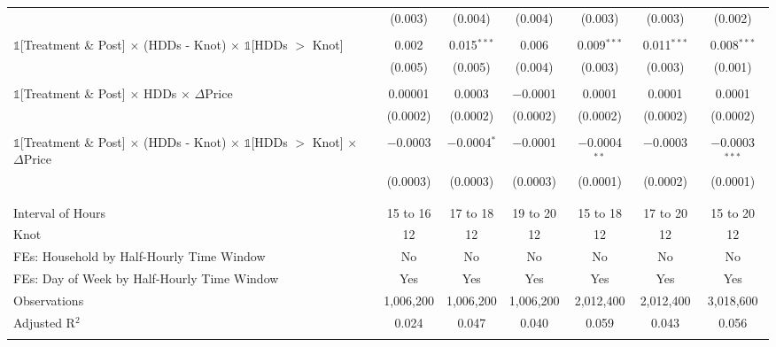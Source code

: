 \begin{table}[!htbp]
\begin{longtable}{@{\extracolsep{15pt}}lcccccc}
  & (0.003) & (0.004) & (0.004) & (0.003) & (0.003) & (0.002) \\ 
  & & & & & & \\ 
 $\mathbb{1}$[Treatment \& Post] $\times$ (HDDs - Knot) $\times$ $\mathbb{1}$[HDDs $>$ Knot] & 0.002 & 0.015$^{***}$ & 0.006 & 0.009$^{***}$ & 0.011$^{***}$ & 0.008$^{***}$ \\ 
  & (0.005) & (0.005) & (0.004) & (0.003) & (0.003) & (0.001) \\ 
  & & & & & & \\ 
 $\mathbb{1}$[Treatment \& Post] $\times$ HDDs $\times$ $\Delta$Price & 0.00001 & 0.0003 & $-$0.0001 & 0.0001 & 0.0001 & 0.0001 \\ 
  & (0.0002) & (0.0002) & (0.0002) & (0.0002) & (0.0002) & (0.0002) \\ 
  & & & & & & \\ 
 $\mathbb{1}$[Treatment \& Post] $\times$ (HDDs - Knot) $\times$ $\mathbb{1}$[HDDs $>$ Knot] $\times$ $\Delta$Price & $-$0.0003 & $-$0.0004$^{*}$ & $-$0.0001 & $-$0.0004$^{**}$ & $-$0.0003 & $-$0.0003$^{***}$ \\ 
  & (0.0003) & (0.0003) & (0.0003) & (0.0001) & (0.0002) & (0.0001) \\ 
  & & & & & & \\ 
\hline \\[-1.8ex] 
Interval of Hours & 15 to 16 & 17 to 18 & 19 to 20 & 15 to 18 & 17 to 20 & 15 to 20 \\ 
Knot & 12 & 12 & 12 & 12 & 12 & 12 \\ 
FEs: Household by Half-Hourly Time Window & No & No & No & No & No & No \\ 
FEs: Day of Week by Half-Hourly Time Window & Yes & Yes & Yes & Yes & Yes & Yes \\ 
Observations & 1,006,200 & 1,006,200 & 1,006,200 & 2,012,400 & 2,012,400 & 3,018,600 \\ 
Adjusted R$^{2}$ & 0.024 & 0.047 & 0.040 & 0.059 & 0.043 & 0.056 \\ 
\hline 
\hline \\[-1.8ex] 
\end{longtable} 
\end{table} 
